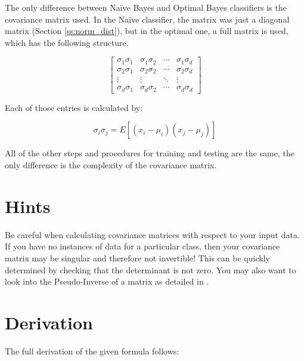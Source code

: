 \documentclass{article}
\begin{document}
The only difference between Na\"ive Bayes and Optimal Bayes classifiers
is the covariance matrix used.  In the Na\"ive classifier, the matrix
was just a diagonal matrix (Section \ref{ss:norm_dist}), but in the optimal one,
a full matrix is used, which has the following structure.

\begin{displaymath}
\begin{bmatrix} \sigma_1\sigma_1 & \sigma_1\sigma_2 & \cdots & \sigma_1\sigma_d \\
				 \sigma_2\sigma_1 & \sigma_2\sigma_2 & \cdots & \sigma_2\sigma_d \\
				 \vdots & \vdots & \ddots & \vdots \\
				 \sigma_d\sigma_1 & \sigma_d\sigma_2 & \cdots & \sigma_d\sigma_d
\end{bmatrix}
\end{displaymath}

Each of those entries is calculated by:

\begin{displaymath}
 \sigma_i\sigma_j = E [{(x_i - \mu_i)(x_j - \mu_j)}]
\end{displaymath}

All of the other steps and procedures for training and testing are the
same, the only difference is the complexity of the covariance matrix.


\section{Hints}
\label{sec:hints}

Be careful when calculating covariance matrices with respect to your
input data. If you have no instances of data for a particular class,
then your covariance matrix may be singular and therefore not
invertible!  This can be quickly determined by checking that the
determinant is not zero.  You may also want to look into the Pseudo-Inverse of a
matrix as detailed in \cite{wiki_pinv}.

\newpage
\appendix
\section{Derivation}
\label{app:derivation}

The full derivation of the given formula follows:
\end{document}
